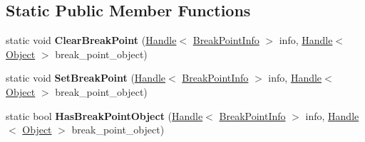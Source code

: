 \subsection*{Static Public Member Functions}
\begin{DoxyCompactItemize}
\item 
static void {\bfseries Clear\+Break\+Point} (\hyperlink{classv8_1_1internal_1_1_handle}{Handle}$<$ \hyperlink{classv8_1_1internal_1_1_break_point_info}{Break\+Point\+Info} $>$ info, \hyperlink{classv8_1_1internal_1_1_handle}{Handle}$<$ \hyperlink{classv8_1_1internal_1_1_object}{Object} $>$ break\+\_\+point\+\_\+object)\hypertarget{classv8_1_1internal_1_1_break_point_info_ad36403b6aef5c298a27971fef29f845a}{}\label{classv8_1_1internal_1_1_break_point_info_ad36403b6aef5c298a27971fef29f845a}

\item 
static void {\bfseries Set\+Break\+Point} (\hyperlink{classv8_1_1internal_1_1_handle}{Handle}$<$ \hyperlink{classv8_1_1internal_1_1_break_point_info}{Break\+Point\+Info} $>$ info, \hyperlink{classv8_1_1internal_1_1_handle}{Handle}$<$ \hyperlink{classv8_1_1internal_1_1_object}{Object} $>$ break\+\_\+point\+\_\+object)\hypertarget{classv8_1_1internal_1_1_break_point_info_ad9496b6de8a915c671c353d1ef3d379c}{}\label{classv8_1_1internal_1_1_break_point_info_ad9496b6de8a915c671c353d1ef3d379c}

\item 
static bool {\bfseries Has\+Break\+Point\+Object} (\hyperlink{classv8_1_1internal_1_1_handle}{Handle}$<$ \hyperlink{classv8_1_1internal_1_1_break_point_info}{Break\+Point\+Info} $>$ info, \hyperlink{classv8_1_1internal_1_1_handle}{Handle}$<$ \hyperlink{classv8_1_1internal_1_1_object}{Object} $>$ break\+\_\+point\+\_\+object)\hypertarget{classv8_1_1internal_1_1_break_point_info_aa79786626248be34e202c696c7c10eeb}{}\label{classv8_1_1internal_1_1_break_point_info_aa79786626248be34e202c696c7c10eeb}

\end{DoxyCompactItemize}
